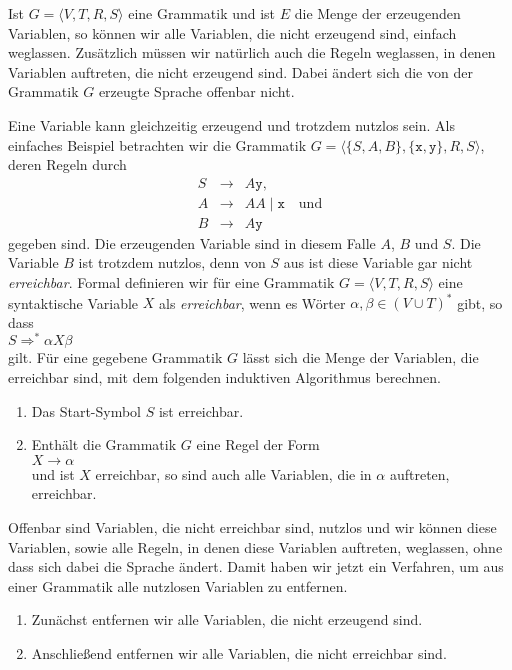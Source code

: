 \noindent
Ist $G = \langle V, T, R, S \rangle$ eine Grammatik und ist $E$ die Menge der erzeugenden Variablen,
so k\"onnen wir alle Variablen, die nicht erzeugend sind, einfach weglassen.  Zus\"atzlich m\"ussen wir
nat\"urlich auch die Regeln weglassen, in denen Variablen auftreten, die nicht erzeugend sind.  Dabei
\"andert sich die von der Grammatik $G$ erzeugte Sprache offenbar nicht.

Eine Variable kann gleichzeitig erzeugend und trotzdem nutzlos sein.  Als einfaches
Beispiel betrachten wir die Grammatik  $G = \langle \{S, A, B \}, \{ \texttt{x}, \texttt{y} \}, R, S \rangle$, deren Regeln durch
\begin{eqnarray*}
  S & \rightarrow & A \texttt{y},           \\
  A & \rightarrow & A A \mid \texttt{x} \quad \mbox{und}    \\
  B & \rightarrow & A \texttt{y} 
\end{eqnarray*}
gegeben sind.  Die erzeugenden Variable sind in diesem Falle $A$, $B$ und $S$.  Die Variable
$B$ ist trotzdem nutzlos, denn von $S$ aus ist diese Variable gar nicht \emph{erreichbar}.
Formal definieren wir f\"ur eine Grammatik $G = \langle V, T, R, S \rangle$ eine syntaktische Variable $X$ als
\emph{erreichbar}, wenn es W\"orter $\alpha, \beta \in (V \cup T)^*$ gibt, so dass 
\\[0.2cm]
\hspace*{1.3cm}
$S \Rightarrow^* \alpha X \beta$
\\[0.2cm]
gilt. F\"ur eine gegebene Grammatik $G$  l\"asst sich die Menge der Variablen, die erreichbar
sind, mit dem folgenden 
induktiven Algorithmus berechnen.
\begin{enumerate}
\item Das Start-Symbol $S$ ist erreichbar.
\item Enth\"alt die Grammatik $G$ eine Regel der Form
      \\[0.2cm]
      \hspace*{1.3cm}
      $X \rightarrow \alpha$
      \\[0.2cm]
      und ist $X$ erreichbar, so sind auch alle Variablen, die in $\alpha$ auftreten, erreichbar.
\end{enumerate}
Offenbar sind Variablen, die nicht erreichbar sind, nutzlos und wir k\"onnen diese Variablen, sowie alle
Regeln, in denen diese Variablen auftreten, weglassen, ohne dass sich dabei die Sprache \"andert.
Damit haben wir jetzt ein Verfahren, um aus einer Grammatik alle nutzlosen Variablen zu entfernen.
\begin{enumerate}
\item Zun\"achst entfernen wir alle Variablen, die nicht erzeugend sind.
\item Anschlie{\ss}end entfernen wir alle Variablen, die nicht erreichbar sind.
\end{enumerate}
